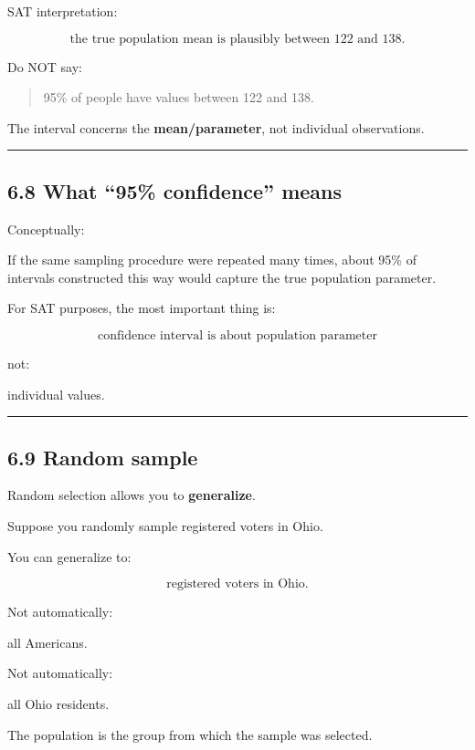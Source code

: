 \documentclass[
]{article}
\begin{document}
SAT interpretation:

\[
\boxed{\text{the true population mean is plausibly between 122 and 138}}.
\]

Do NOT say:

\begin{quote}
95\% of people have values between 122 and 138.
\end{quote}

The interval concerns the \textbf{mean/parameter}, not individual
observations.

\begin{center}\rule{0.5\linewidth}{0.5pt}\end{center}

\subsection{6.8 What ``95\% confidence''
means}\label{what-95-confidence-means}

Conceptually:

If the same sampling procedure were repeated many times, about 95\% of
intervals constructed this way would capture the true population
parameter.

For SAT purposes, the most important thing is:

\[
\boxed{\text{confidence interval is about population parameter}}
\]

not:

individual values.

\begin{center}\rule{0.5\linewidth}{0.5pt}\end{center}

\subsection{6.9 Random sample}\label{random-sample}

Random selection allows you to \textbf{generalize}.

Suppose you randomly sample registered voters in Ohio.

You can generalize to:

\[
\boxed{\text{registered voters in Ohio}}.
\]

Not automatically:

all Americans.

Not automatically:

all Ohio residents.

The population is the group from which the sample was selected.
\end{document}
